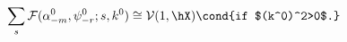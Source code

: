 \begin{equation}
%
\sum_{s} {\cal F}(\alpha^{0}_{-m}, \psi^{0}_{-r};s, k^0) \cong {\cal V}(1, \hX) 
\cond{if $(k^0)^2>0$.}
\label{eq:verma}
%
\end{equation}

